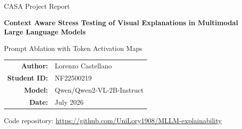 \documentclass[11pt,a4paper]{article}
\begin{document}

\begin{titlepage}
\centering
\vspace*{2.5cm}
{\Large CASA Project Report\par}
\vspace{1.1cm}
{\huge\bfseries Context Aware Stress Testing of Visual Explanations in Multimodal Large Language Models\par}
\vspace{0.45cm}
{\Large Prompt Ablation with Token Activation Maps\par}
\vfill
\begin{tabular}{rl}
\textbf{Author:} & Lorenzo Castellano \\
\textbf{Student ID:} & NF22500219 \\
\textbf{Model:} & Qwen/Qwen2-VL-2B-Instruct \\
\textbf{Date:} & July 2026 \\
\end{tabular}
\vfill
{\small Code repository: \url{https://github.com/UniLory1908/MLLM-explainability}\par}
\end{titlepage}

\begin{abstract}
Multimodal Large Language Models can produce plausible answers even when their use of visual evidence is unstable or strongly influenced by linguistic context. This report presents a controlled prompt ablation study of Qwen2-VL-2B-Instruct using Token Activation Maps (TAMs). A fixed set of 100 COCO images is evaluated with eight prompt conditions, for a total of 800 cases and almost one million maps indexed across tokens and layers. The analysis combines response diagnostics with measures derived from TAM, including concentration, diffusion, spatial displacement, hotspot structure and trajectories across layers and words. Changes with respect to the neutral prompt are summarized through an index based on percentile ranks. A nearest centroid experiment, grouped by image, tests whether the prompt conditions can still be distinguished in the metric space without placing variants of the same image in both training and test folds. The results show measurable differences associated with the prompt and a separability clearly above chance. The largest shifts are found for the misleading prompt, the object detection prompt and the prompt that stresses response order. The output analysis also distinguishes 139 responses with bbox or location signals from 102 responses containing coordinates that can be parsed and shown as overlays. These findings are diagnostic rather than causal: TAMs are not ground truth, do not certify correct grounding, and parseable coordinates do not form a localization benchmark.
\end{abstract}
\end{document}
